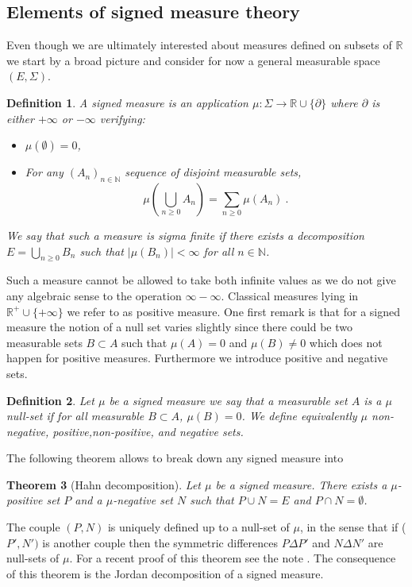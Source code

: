 \documentclass[11pt,a4paper]{article}
\newcommand{\RR}{\mathbb{R}}
\newcommand{\NN}{\mathbb{N}}
\newcommand{\Seq}[1]{\left(#1\right)_{n\in \mathbb{N}}}
\newtheorem{theorem}{Theorem}[section]
\newtheorem{definition}[theorem]{Definition}
\begin{document}
\subsection{Elements of signed measure theory}
Even though we are ultimately interested about measures defined on subsets of $\RR$ we start by a broad picture and consider for now a general measurable space $(E,\Sigma)$.
\begin{definition}
    A signed measure is an application $\mu : \Sigma \to \RR \cup\lbrace \partial \rbrace$ where $\partial $ is either $+\infty$ or $-\infty$ verifying:
    \begin{itemize}
        \item $\mu(\emptyset) = 0$,
        \item For any $\Seq{A_n}$ sequence of disjoint measurable sets,
        \[\mu \left( \bigcup\limits_{n \geq 0} A_n\right) = \sum\limits_{n \geq 0} \mu(A_n)\ .\]
    \end{itemize}
    We say that such a measure is sigma finite if there exists a decomposition $E = \bigcup\limits_{n \geq 0} B_n$ such that $|\mu(B_n)| < \infty$ for all $n \in \NN$.
\end{definition}
Such a measure cannot be allowed to take both infinite values as we do not give any algebraic sense to the operation $\infty - \infty$. Classical measures lying in $\RR^+\cup\lbrace +\infty\rbrace$ we refer to as positive measure. One first remark is that for a signed measure the notion of a null set varies slightly since there could be two measurable sets $B\subset A$ such that $\mu(A) = 0$ and $\mu(B) \neq 0$ which does not happen for positive measures. Furthermore we introduce positive and negative sets.
\begin{definition}
    Let $\mu$ be a signed measure we say that a measurable set $A$ is a $\mu$ null-set if for all measurable $B \subset A$, $\mu(B) = 0$. We define equivalently $\mu$ non-negative, positive,non-positive, and negative sets.
\end{definition}
The following theorem allows to break down any signed measure into 
\begin{theorem}[Hahn decomposition]
    Let $\mu$ be a signed measure. There exists a $\mu$-positive set $P$ and a $\mu$-negative set $N$ such that $P\cup N = E$ and $P\cap N = \emptyset$. 
\end{theorem}
The couple $(P,N)$ is uniquely defined up to a null-set of $\mu$, in the sense that if ($P',N')$ is another couple then the symmetric differences $P\Delta P'$ and $N\Delta N'$ are null-sets of $\mu$. For a recent proof of this theorem see the note \cite{fischer2012existence}. The consequence of this theorem is the Jordan decomposition of a signed measure.
\end{document}
